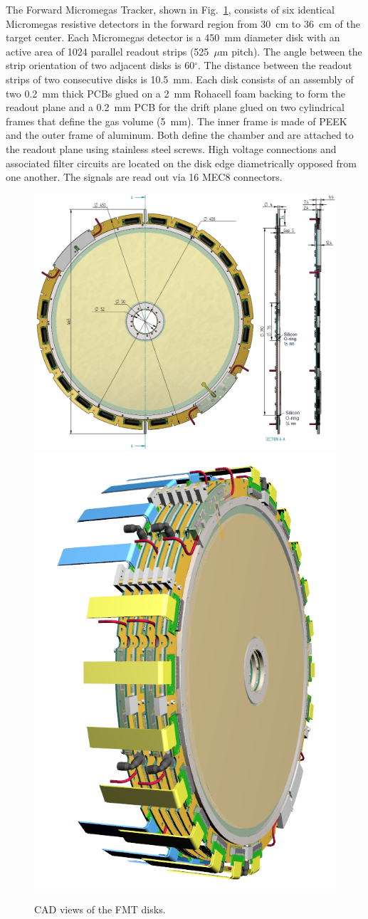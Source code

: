 The Forward Micromegas Tracker, shown in Fig.~\ref{fig:mm-fig5}, consists of six identical Micromegas resistive detectors in
the forward region from 30~cm to 36~cm of the target center. Each Micromegas detector is a 450~mm diameter disk with an
active area of 1024 parallel readout strips (525~$\mu$m pitch). The angle between the strip orientation of two adjacent disks
is 60$^\circ$. The distance between the readout strips of two consecutive disks is 10.5~mm.  Each disk consists of an assembly
of two 0.2~mm thick PCBs glued on a 2~mm Rohacell foam backing to form the readout plane and a 0.2~mm PCB for the drift plane
glued on two cylindrical frames that define the gas volume (5~mm). The inner frame is made of PEEK and the outer frame of
aluminum. Both define the chamber and are attached to the readout plane using stainless steel screws. High voltage connections
and associated filter circuits are located on the disk edge diametrically opposed from one another. The signals are read out via
16 MEC8 connectors. 

\begin{figure}[htb]
 
\includegraphics[width=0.66\columnwidth,keepaspectratio]{images/fig6_1}
\includegraphics[width=0.33\columnwidth,keepaspectratio]{images/fig6_2}
 \caption{CAD views of the FMT disks.}
 \label{fig:mm-fig5}
\end{figure}

